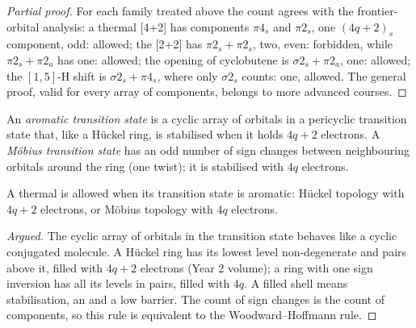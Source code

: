 \begin{proof}[Partial proof]
For each family treated above the count agrees with the frontier-orbital
analysis: a thermal [4+2]  has components $\pi4_s$ and $\pi2_s$, one $(4q + 2)_s$
component, odd: allowed; the [2+2] has $\pi2_s + \pi2_s$, two, even: forbidden, while
$\pi2_s + \pi2_a$ has one: allowed; the  opening of cyclobutene is $\sigma2_s + \pi2_a$, one:
allowed; the  $[1,5]$-H shift is $\sigma2_s + \pi4_s$, where only $\sigma2_s$ counts: one,
allowed. The general proof, valid for every array of components, belongs
to more advanced courses.
\end{proof}

\begin{definition}\label{def:b3:pericyclic:mobius}
An \emph{aromatic transition state} is a cyclic
array of orbitals in a pericyclic transition state that, like a Hückel ring, is
stabilised when it holds $4q + 2$ electrons. A \emph{Möbius transition
state} has an odd number of sign changes between
neighbouring orbitals around the ring (one  twist); it is
stabilised with $4q$ electrons.
\end{definition}

\begin{proposition}\label{prop:b3:pericyclic:aromatic-ts}
A thermal  is allowed when its transition state is aromatic:
Hückel topology with $4q + 2$ electrons, or Möbius topology with $4q$ electrons.
\end{proposition}

\begin{proof}[Argued]
The cyclic array of orbitals in the transition state behaves like a cyclic
conjugated molecule. A Hückel ring has its lowest level non-degenerate and pairs
above it, filled with $4q + 2$ electrons (Year 2 volume); a ring with one sign
inversion has all its levels in pairs, filled with $4q$. A filled shell means
stabilisation, an  and a low barrier. The count of sign
changes is the count of  components, so this rule is equivalent to the
Woodward--Hoffmann rule.
\end{proof}

